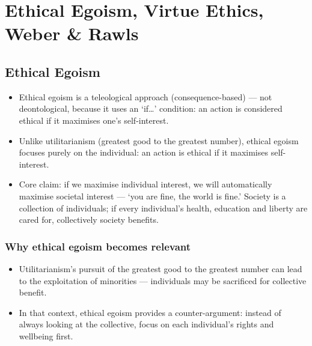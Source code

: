 \chapter{Ethical Egoism, Virtue Ethics, Weber \& Rawls}
\label{ch:egoism-virtue-weber-rawls}

\section{Ethical Egoism}

\begin{KeyConcept}
\begin{itemize}
\item Ethical egoism is a teleological approach (consequence-based) --- not deontological, because it uses an `if\ldots' condition: an action is considered ethical if it maximises one's self-interest.
\item Unlike utilitarianism (greatest good to the greatest number), ethical egoism focuses purely on the individual: an action is ethical if it maximises self-interest.
\item Core claim: if we maximise individual interest, we will automatically maximise societal interest --- `you are fine, the world is fine.' Society is a collection of individuals; if every individual's health, education and liberty are cared for, collectively society benefits.
\end{itemize}
\end{KeyConcept}

\subsection*{Why ethical egoism becomes relevant}
\begin{itemize}
\item Utilitarianism's pursuit of the greatest good to the greatest number can lead to the exploitation of minorities --- individuals may be sacrificed for collective benefit.
\item In that context, ethical egoism provides a counter-argument: instead of always looking at the collective, focus on each individual's rights and wellbeing first.
\end{itemize}


